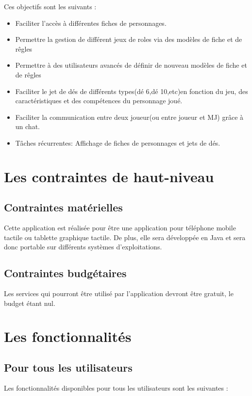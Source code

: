 ﻿\documentclass[11pt,a4paper]{article}
\begin{document}
Ces objectifs sont les suivants :

\begin{itemize}
  \item Faciliter l'accès à différentes fiches de personnages.
	\item Permettre la gestion de différent jeux de roles via des modèles de fiche et de rêgles
\item Permettre à des utilisateurs avancés de définir de nouveau modèles de fiche et de rêgles
  \item Faciliter le jet de dés de différents types(dé 6,dé 10,etc)en fonction
  du jeu, des caractéristiques et des compétences du personnage joué.
  \item Faciliter la communication entre deux joueur(ou entre joueur et MJ)
  grâce à un chat.
  \item Tâches récurrentes: Affichage de fiches de personnages et jets de dés.
\end{itemize}

\clearpage

\section{Les contraintes de haut-niveau}
\subsection{Contraintes matérielles}

Cette application est réalisée pour être une application pour téléphone mobile
tactile ou tablette graphique tactile. De plus, elle sera développée en Java et
sera donc portable sur différents systèmes d'exploitations.

\subsection{Contraintes budgétaires}

Les services qui pourront être utilisé par l'application devront être gratuit, le budget étant nul.

\section{Les fonctionnalités}

\subsection{Pour tous les utilisateurs}
Les fonctionnalités disponibles pour tous les utilisateurs sont les suivantes :
\end{document}
